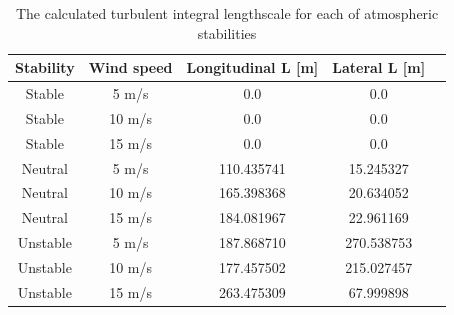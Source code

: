 \begin{table}
\caption{\label{tab:StabilityStudyLscale} The calculated turbulent
  integral lengthscale for each of atmospheric stabilities} \centering
\begin{tabular}{ccccc}
  \hline
  Stability   & Wind speed & Longitudinal L [m] & Lateral L [m] \\
  \hline
  Stable      &   5 m/s  & 0.0           & 0.0        \\
  Stable      &  10 m/s  & 0.0           & 0.0        \\
  Stable      &  15 m/s  & 0.0           & 0.0        \\
  Neutral     &   5 m/s  & 110.435741    & 15.245327  \\
  Neutral     &  10 m/s  & 165.398368    & 20.634052  \\
  Neutral     &  15 m/s  & 184.081967    & 22.961169  \\
  Unstable    &   5 m/s  & 187.868710    & 270.538753 \\
  Unstable    &  10 m/s  & 177.457502    & 215.027457 \\
  Unstable    &  15 m/s  & 263.475309    & 67.999898  \\
\hline
\end{tabular}
\end{table}
